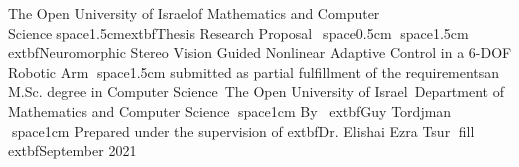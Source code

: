 \documentclass[preview]{standalone}
\begin{document}
\begin{center}
The Open University of Israel\Department of Mathematics and Computer Sciencespace{1.5cm}{\large 	extbf{Thesis Research Proposal}}\        space{0.5cm}                space{1.5cm}  {\Large 	extbf{Neuromorphic Stereo Vision Guided Nonlinear Adaptive Control in a 6-DOF Robotic Arm}}                space{1.5cm}                submitted as partial fulfillment of the requirements\towards an M.Sc. degree in Computer Science\        The Open University of Israel\        Department of Mathematics and Computer Science                space{1cm}                By \        	extbf{Guy Tordjman}                space{1cm}                Prepared under the supervision of 	extbf{Dr. Elishai Ezra Tsur}                fill        	extbf{September 2021}
\end{center}
\end{document}
